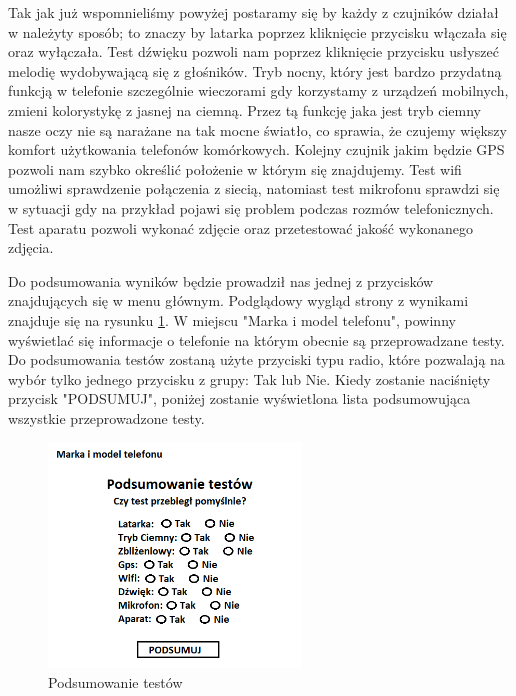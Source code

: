 Tak jak już wspomnieliśmy powyżej postaramy się by każdy z czujników działał w należyty sposób; to znaczy by latarka poprzez kliknięcie przycisku włączała się oraz wyłączała. Test dźwięku pozwoli nam poprzez kliknięcie przycisku usłyszeć melodię wydobywającą się z głośników. Tryb nocny, który jest bardzo przydatną funkcją w telefonie szczególnie wieczorami gdy korzystamy z urządzeń mobilnych, zmieni kolorystykę z jasnej na ciemną. Przez tą funkcję jaka jest tryb ciemny nasze oczy nie są narażane na tak mocne światło, co sprawia, że czujemy większy komfort użytkowania telefonów komórkowych. Kolejny czujnik jakim będzie GPS pozwoli nam szybko określić położenie w którym się znajdujemy. Test wifi umożliwi sprawdzenie połączenia z siecią, natomiast test mikrofonu sprawdzi się w sytuacji gdy na przykład pojawi się problem podczas rozmów telefonicznych. Test aparatu pozwoli wykonać zdjęcie oraz przetestować jakość wykonanego zdjęcia.

\newpage


Do podsumowania wyników będzie prowadził nas jednej z przycisków znajdujących się w menu głównym. Podglądowy wygląd strony z wynikami znajduje się na rysunku \ref{rys:wyniki_punkt2}. W miejscu "Marka i model telefonu", powinny wyświetlać się informacje o telefonie na którym obecnie są przeprowadzane testy. Do podsumowania testów zostaną użyte przyciski typu radio, które pozwalają na wybór tylko jednego przycisku z grupy: Tak lub Nie. Kiedy zostanie naciśnięty przycisk "PODSUMUJ", poniżej zostanie wyświetlona lista podsumowująca wszystkie przeprowadzone testy.

\begin{figure}[!hbt]
	\begin{center}
		\includegraphics[angle=360, width=0.60\textwidth]{rys/punkt2/wyniki.png}
		\caption{Podsumowanie testów}
		\label{rys:wyniki_punkt2}
	\end{center}
\end{figure}






